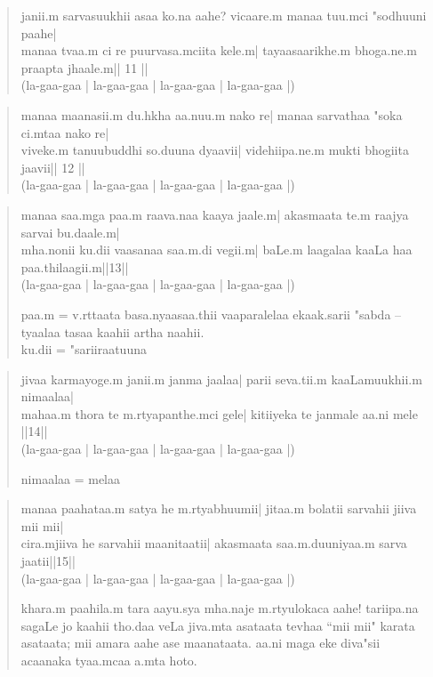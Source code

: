 \documentclass[a6paper]{article}
\begin{document}
    \begin{verse}
        janii.m sarvasuukhii asaa ko.na aahe?
        vicaare.m manaa tuu.mci "sodhuuni paahe|\\

        manaa tvaa.m ci re puurvasa.mciita kele.m|
        tayaasaarikhe.m bhoga.ne.m praapta jhaale.m|| 11 ||\\
        (la-gaa-gaa | la-gaa-gaa | la-gaa-gaa | la-gaa-gaa |)
    \end{verse}
    \begin{verse}
        manaa maanasii.m du.hkha aa.nuu.m nako re|
        manaa sarvathaa "soka ci.mtaa nako re|\\

        viveke.m tanuubuddhi so.duuna dyaavii|
        videhiipa.ne.m mukti bhogiita jaavii|| 12 ||\\
        (la-gaa-gaa | la-gaa-gaa | la-gaa-gaa | la-gaa-gaa |)
    \end{verse}
    \begin{verse}
        manaa saa.mga paa.m raava.naa kaaya jaale.m|
        akasmaata te.m raajya sarvai bu.daale.m|\\

        mha.nonii ku.dii vaasanaa saa.m.di vegii.m|
        baLe.m laagalaa kaaLa haa paa.thilaagii.m||13||\\
        (la-gaa-gaa | la-gaa-gaa | la-gaa-gaa | la-gaa-gaa |)

        paa.m = v.rttaata basa.nyaasaa.thii vaaparalelaa ekaak.sarii "sabda -- tyaalaa tasaa kaahii artha naahii.\\
        ku.dii = "sariiraatuuna
    \end{verse}
    \begin{verse}
        jivaa karmayoge.m janii.m janma jaalaa|
        parii seva.tii.m kaaLamuukhii.m nimaalaa|\\

        mahaa.m thora te m.rtyapanthe.mci gele|
        kitiiyeka te janmale aa.ni mele ||14||\\
        (la-gaa-gaa | la-gaa-gaa | la-gaa-gaa | la-gaa-gaa |)

        nimaalaa = melaa \\
    \end{verse}
    \begin{verse}
        manaa paahataa.m satya he m.rtyabhuumii|
        jitaa.m bolatii sarvahii jiiva mii mii|\\

        cira.mjiiva he sarvahii maanitaatii|
        akasmaata saa.m.duuniyaa.m sarva jaatii||15||\\
        (la-gaa-gaa | la-gaa-gaa | la-gaa-gaa | la-gaa-gaa |)

        khara.m paahila.m tara aayu.sya mha.naje m.rtyulokaca aahe! tariipa.na sagaLe jo kaahii tho.daa veLa jiva.mta asataata tevhaa ``mii mii" karata asataata; mii amara aahe ase maanataata. aa.ni maga eke diva"sii acaanaka tyaa.mcaa a.mta hoto.\\
    \end{verse}
\end{document}
